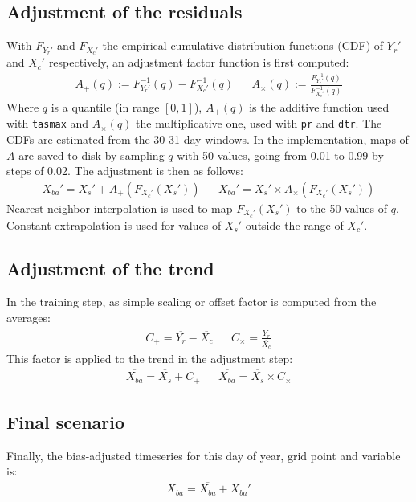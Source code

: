 \documentclass[letterpaper,10pt]{article}
\begin{document}
\subsection{Adjustment of the residuals}
With $F_{Y_r'}$ and $F_{X_c'}$ the empirical cumulative distribution functions (CDF) of $Y_r'$ and $X_c'$ respectively, an adjustment factor function is first computed:
\begin{align}
A_+(q) := F^{-1}_{Y_r'}\left(q\right) - F^{-1}_{X_c'}\left(q\right)  && A_\times(q) := \frac{F^{-1}_{Y_r'}\left(q\right)}{F^{-1}_{X_c'}\left(q\right)}
\end{align}
Where $q$ is a quantile (in range $[0, 1]$), $A_+(q)$ is the additive function used with \texttt{tasmax} and $A_\times(q)$ the multiplicative one, used with \texttt{pr} and \texttt{dtr}.
The CDFs are estimated from the 30 31-day windows.
In the implementation, maps of $A$ are saved to disk by sampling $q$ with 50 values, going from 0.01 to 0.99 by steps of 0.02.
The adjustment is then as follows:
\begin{align}
X_{ba}' = X_s' + A_+\left(F_{X_c'}(X_s')\right) && X_{ba}' = X_s' \times A_\times\left(F_{X_c'}(X_s')\right)
\end{align}
Nearest neighbor interpolation is used to map $F_{X_c'}(X_s')$ to the 50 values of $q$.
Constant extrapolation is used for values of $X_s'$ outside the range of $X_c'$.

\subsection{Adjustment of the trend}
In the training step, as simple scaling or offset factor is computed from the averages:
\begin{align}
C_+ = \overline{Y_r} - \overline{X_c} && C_\times = \frac{\overline{Y_r}}{\overline{X_c}}
\end{align}
This factor is applied to the trend in the adjustment step:
\begin{align}
\overline{X_{ba}} = \overline{X_s} + C_+  && \overline{X_{ba}} = \overline{X_s}\times C_\times
\end{align}

\subsection{Final scenario}
Finally, the bias-adjusted timeseries for this day of year, grid point and variable is:
\begin{align}
X_{ba} = \overline{X_{ba}} + X_{ba}'
\end{align}
\end{document}
